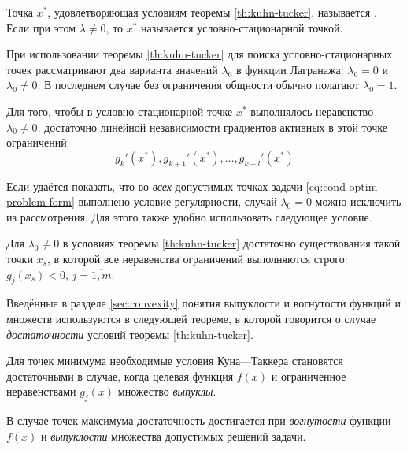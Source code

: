 \begin{dfn}
  Точка $x^*$, удовлетворяющая условиям теоремы \ref{th:kuhn-tucker},
  называется . Если при этом $\lambda ≠
  0$, то $x^*$ называется  условно-стационарной
  точкой.
\end{dfn}

При использовании теоремы \ref{th:kuhn-tucker} для поиска
условно-стационарных точек рассматривают два варианта значений
$\lambda_0$ в функции Лагранажа: $\lambda_0=0$ и $\lambda_0 \neq 0$. В
последнем случае без ограничения общности обычно полагают $\lambda_0 =
1$.

\begin{thm}
  \label{th:regular}
  Для того, чтобы в условно-стационарной точке $x^*$ выполнялось
  неравенство $\lambda_0 \neq 0$, достаточно линейной независимости
  градиентов активных в этой точке ограничений
  \begin{equation*}
    g_k'(x^*), g_{k+1}'(x^*), \dotsc, g_{k+l}'(x^*)
  \end{equation*}
\end{thm}

Если удаётся показать, что во \emph{всех} допустимых точках задачи
\eqref{eq:cond-optim-problem-form} выполнено условие регулярности,
случай $\lambda_0=0$ можно исключить из рассмотрения. Для этого также
удобно использовать следующее условие.

\begin{thm}
  \label{th:slater}
  Для $\lambda_0 \neq 0$ в условиях теоремы \ref{th:kuhn-tucker}
  достаточно существования такой точки $x_s$, в которой все
  неравенства ограничений выполняются строго: $g_j(x_s)<0, \,
  j=\overline{1,m}$.
\end{thm}

Введённые в разделе \ref{sec:convexity} понятия выпуклости и
вогнутости функций и множеств используются в следующей теореме, в
которой говорится о случае \emph{достаточности} условий теоремы
\ref{th:kuhn-tucker}.

\begin{thm}
  \label{th:kt-cond}
  Для точек минимума необходимые условия Куна—Таккера становятся
  достаточными в случае, когда целевая функция $f(x)$ и ограниченное
  неравенствами $g_j(x)$ множество \emph{выпуклы}.

  В случае точек максимума достаточность достигается при
  \emph{вогнутости} функции $f(x)$ и \emph{выпуклости} множества
  допустимых решений задачи.
\end{thm}

